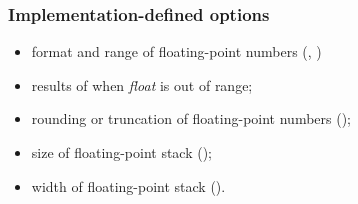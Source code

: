 \subsubsection{Implementation-defined options} %
\begin{itemize}
\item format and range of floating-point numbers
	(,
	 )
\item results of  when
	\emph{float} is out of range;
\item rounding or truncation of floating-point numbers
	();
\item size of floating-point stack
	();
\item width of floating-point stack
	().
\end{itemize}


